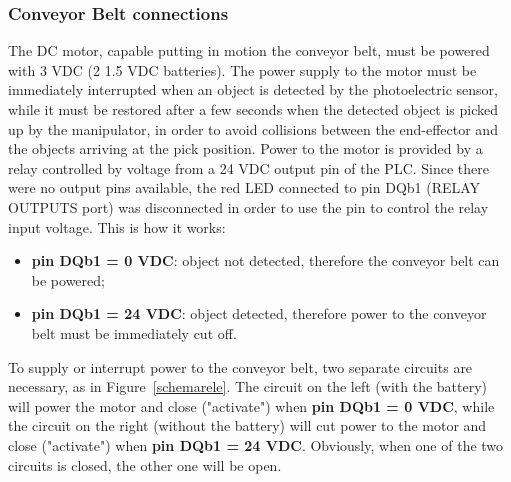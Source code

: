 \documentclass[a4paper,11pt]{report}
\theoremstyle{definition}
\theoremstyle{plain}
\begin{document}
            \subsubsection{Conveyor Belt connections}
                The DC motor, capable putting in motion the conveyor belt, must be powered with 3 VDC (2 1.5 VDC batteries). The power supply to the motor must be immediately interrupted when an object is detected by the photoelectric sensor, while it must be restored after a few seconds when the detected object is picked up by the manipulator, in order to avoid collisions between the end-effector and the objects arriving at the pick position.
                Power to the motor is provided by a relay controlled by voltage from a 24 VDC output pin of the PLC. Since there were no output pins available, the red LED connected to pin DQb1 (RELAY OUTPUTS port) was disconnected in order to use the pin to control the relay input voltage. This is how it works:
                \begin{itemize}
                    \item \textbf{pin DQb1 = 0 VDC}: object not detected, therefore the conveyor belt can be powered;
                    \item \textbf{pin DQb1 = 24 VDC}: object detected, therefore power to the conveyor belt must be immediately cut off.
                \end{itemize}
                To supply or interrupt power to the conveyor belt, two separate circuits are necessary, as in Figure~\ref{schemarele}. The circuit on the left (with the battery) will power the motor and close ("activate") when \textbf{pin DQb1 = 0 VDC}, while the circuit on the right (without the battery) will cut power to the motor and close ("activate") when \textbf{pin DQb1 = 24 VDC}. Obviously, when one of the two circuits is closed, the other one will be open.
\end{document}
